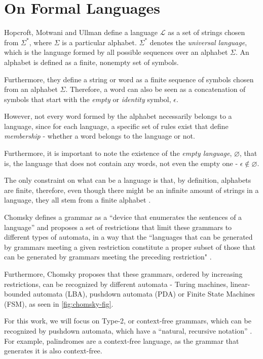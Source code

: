 \chapter{On Formal Languages}

Hopcroft, Motwani and Ullman define a language $\mathcal{L}$ as a set of strings chosen from $\Sigma^*$, where $\Sigma$ is a particular alphabet. $\Sigma^*$ denotes the \emph{universal language}, which is the language formed by all possible sequences over an alphabet $\Sigma$. An alphabet is defined as a finite, nonempty set of symbols. \cite{hopcroft-automata}

Furthermore, they define a string or word as a finite sequence of symbols chosen from an alphabet $\Sigma$. Therefore, a word can also be seen as a concatenation of symbols that start with the \emph{empty} or \emph{identity} symbol, $\epsilon$.

However, not every word formed by the alphabet necessarily belongs to a language, since for each language, a specific set of rules exist that define \emph{membership} - whether a word belongs to the language or not.

Furthermore, it is important to note the existence of the \emph{empty language}, $\varnothing$, that is, the language that does not contain any words, not even the empty one - $\epsilon \notin \varnothing$.

The only constraint on what can be a language is that, by definition, alphabets are finite, therefore, even though there might be an infinite amount of strings in a language, they all stem from a finite alphabet \cite{hopcroft-automata}.

Chomsky defines a grammar as a ``device that enumerates the sentences of a language'' and proposes a set of restrictions that limit these grammars to different types of automata, in a way that the ``languages that can be generated by grammars meeting a given restriction constitute a proper subset of those that can be generated by grammars meeting the preceding restriction" \cite{chomsky-hierarchy}. 

Furthermore, Chomsky proposes that these grammars, ordered by increasing restrictions, can be recognized by different automata - Turing machines, linear-bounded automata (LBA), pushdown automata (PDA) or Finite State Machines (FSM), as seen in \ref{fig:chomsky-fig}.

For this work, we will focus on Type-2, or context-free grammars, which can be recognized by pushdown automata, which have a ``natural, recursive notation'' \cite{hopcroft-automata}. For example, palindromes are a context-free language, as the grammar that generates it is also context-free.

